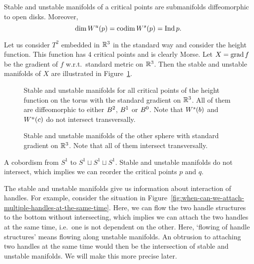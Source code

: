 \begin{prop}
    Stable and unstable manifolds of a critical points are submanifolds diffeomorphic to open disks. Moreover,
    \[
        \dim W^u(p) = \operatorname{codim} W^s(p) = \operatorname{Ind} p
    .\] 
\end{prop}


\begin{eg}
    Let us consider $T^{2}$ embedded in $\mathbb{R}^3$ in the standard way and consider the height function. 
    This function has $4$ critical points and is clearly Morse.
    Let $X = \operatorname{grad} f$ be the gradient of $f$ w.r.t.\ standard metric on $\mathbb{R}^{3}$.
    Then the stable and unstable manifolds of $X$ are illustrated in Figure~\ref{fig:torus-height-function-stable-and-unstable-manifolds}.
    \label{eg:torus-stable-unstable-manifolds-standard-gradient}
\end{eg}
    \begin{figure}[H]
        \centering
        \caption{
        Stable and unstable manifolds for all critical points of the height function on the torus with the standard gradient on $\mathbb{R}^3$.
    All of them are diffeomorphic to either $B^{2}$, $B^{1}$ or  $B^{0}$.
    Note that $W^s(b)$ and  $W^u(c)$ do not intersect transversally.
}
        \label{fig:torus-height-function-stable-and-unstable-manifolds}
    \end{figure}

    \begin{figure}[H]
        \centering
        \caption{
            Stable and unstable manifolds of the other sphere with standard gradient on $\mathbb{R}^3$.  Note that all of them intersect transversally.
        }
        \label{fig:other-sphere-definition-of-mathcal-m}
    \end{figure}


    \begin{marginfigure}
        \centering
        \caption{
            A cobordism from $S^{1}$ to $S^{1} \sqcup S^1 \sqcup S^1$.
            Stable and unstable manifolds do not intersect, which implies we can reorder the critical points $p$ and $q$.
        }
        \label{fig:when-can-we-attach-multiple-handles-at-the-same-time}
    \end{marginfigure}
    The stable and unstable manifolds give us information about interaction of handles.
    For example, consider the situation in Figure~\ref{fig:when-can-we-attach-multiple-handles-at-the-same-time}.
    Here, we can flow the two handle structures to the bottom without intersecting, which implies we can attach the two handles at the same time, i.e.\ one is not dependent on the other.
    Here, `flowing of handle structures' means flowing along unstable manifolds.
    An obtrusion to attaching two handles at the same time would then be the intersection of stable and unstable manifolds. We will make this more precise later.
